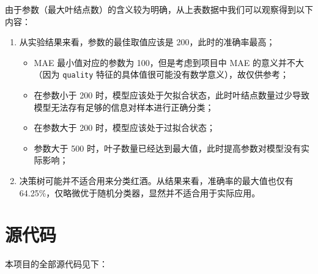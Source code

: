 \documentclass[12pt]{ctexart}
\begin{document}
    由于参数（最大叶结点数）的含义较为明确，从上表数据中我们可以观察得到以下内容：

    \begin{enumerate}
        \item 从实验结果来看，参数的最佳取值应该是 200，此时的准确率最高；
        \begin{itemize}
            \item MAE 最小值对应的参数为 100，但是考虑到项目中 MAE 的意义并不大（因为 \texttt{quality} 特征的具体值很可能没有数学意义），故仅供参考；
            \item 在参数小于 200 时，模型应该处于欠拟合状态，此时叶结点数量过少导致模型无法存有足够的信息对样本进行正确分类；
            \item 在参数大于 200 时，模型应该处于过拟合状态；
            \item 参数大于 500 时，叶子数量已经达到最大值，此时提高参数对模型没有实际影响；
        \end{itemize}
        \item 决策树可能并不适合用来分类红酒。从结果来看，准确率的最大值也仅有 64.25\%，仅略微优于随机分类器，显然并不适合用于实际应用。
    \end{enumerate}

    \section{源代码}

    本项目的全部源代码见下：
\end{document}
